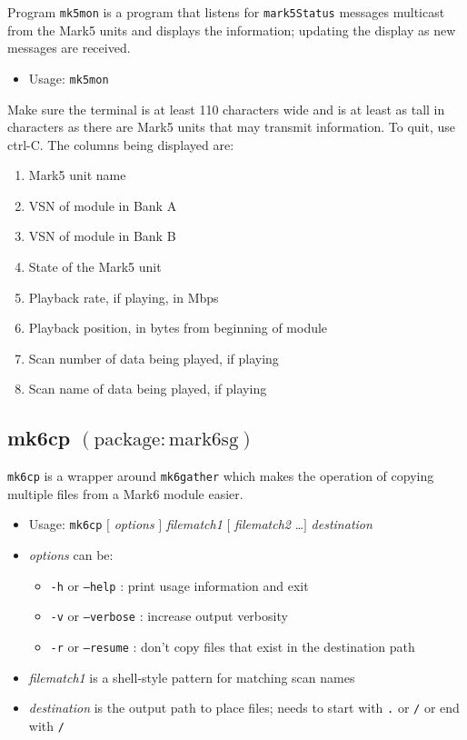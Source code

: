 Program {\tt mk5mon} is a program that listens for {\tt mark5Status} messages multicast from the Mark5 units and displays the information; updating the display as new messages are received.

\begin{itemize}
\item[] Usage: {\tt mk5mon}
\end{itemize}

Make sure the terminal is at least 110 characters wide and is at least as tall in characters as there are Mark5 units that may transmit information.
To quit, use ctrl-C.
The columns being displayed are:
\begin{enumerate}
\item Mark5 unit name
\item VSN of module in Bank A
\item VSN of module in Bank B
\item State of the Mark5 unit
\item Playback rate, if playing, in Mbps
\item Playback position, in bytes from beginning of module
\item Scan number of data being played, if playing
\item Scan name of data being played, if playing
\end{enumerate}





\subsection{mk6cp {\small $\mathrm{(package: mark6sg)}$} \label{sec:mk6cp}}

{\tt mk6cp} is a wrapper around {\tt mk6gather} which makes the operation of copying multiple files from a Mark6 module easier.

\begin{itemize}
\item[] Usage: {\tt mk6cp} $[$ {\em options} $]$ {\em filematch1} $[$ {\em filematch2} \ldots $]$ {\em destination}
\item[] {\em options} can be:
\begin{itemize}
\item[] {\tt -h} or {\tt --help} : print usage information and exit
\item[] {\tt -v} or {\tt --verbose} : increase output verbosity
\item[] {\tt -r} or {\tt --resume} : don't copy files that exist in the destination path
\end{itemize}
\item[] {\em filematch1} is a shell-style pattern for matching scan names
\item[] {\em destination} is the output path to place files; needs to start with {\tt .} or {\tt /} or end with {\tt /}  
\end{itemize}




